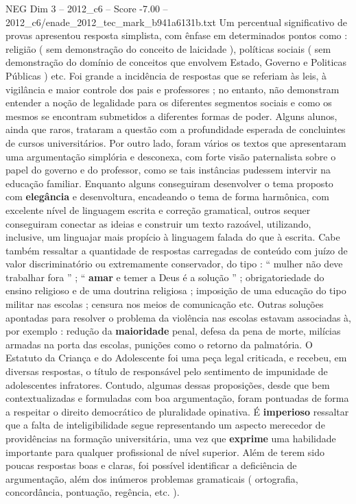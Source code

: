 \begin{textsample}{NEG Dim 3 – 2012\_c6 – Score -7.00 – 2012\_c6/enade\_2012\_tec\_mark\_b941a6131b.txt}
Um percentual significativo de provas apresentou resposta simplista, com ênfase em determinados pontos como : religião ( sem demonstração do conceito de laicidade ), políticas sociais ( sem demonstração do domínio de conceitos que envolvem Estado, Governo e Politicas Públicas ) etc.
Foi grande a incidência de respostas que se referiam às leis, à vigilância e maior controle dos pais e professores ; no entanto, não demonstram entender a noção de legalidade para os diferentes segmentos sociais e como os mesmos se encontram submetidos a diferentes formas de poder.
Alguns alunos, ainda que raros, trataram a questão com a profundidade esperada de concluintes de cursos universitários.
Por outro lado, foram vários os textos que apresentaram uma argumentação simplória e desconexa, com forte visão paternalista sobre o papel do governo e do professor, como se tais instâncias pudessem intervir na educação familiar.
Enquanto alguns conseguiram desenvolver o tema proposto com \textbf{elegância} e desenvoltura, encadeando o tema de forma harmônica, com excelente nível de linguagem escrita e correção gramatical, outros sequer conseguiram conectar as ideias e construir um texto razoável, utilizando, inclusive, um linguajar mais propício à linguagem falada do que à escrita.
Cabe também ressaltar a quantidade de respostas carregadas de conteúdo com juízo de valor discriminatório ou extremamente conservador, do tipo : “ mulher não deve trabalhar fora ” ; “ \textbf{amar} e temer a Deus é a solução ” ; obrigatoriedade do ensino religioso e de uma doutrina religiosa ; imposição de uma educação do tipo militar nas escolas ; censura nos meios de comunicação etc.
Outras soluções apontadas para resolver o problema da violência nas escolas estavam associadas à, por exemplo : redução da \textbf{maioridade} penal, defesa da pena de morte, milícias armadas na porta das escolas, punições como o retorno da palmatória.
O Estatuto da Criança e do Adolescente foi uma peça legal criticada, e recebeu, em diversas respostas, o título de responsável pelo sentimento de impunidade de adolescentes infratores.
Contudo, algumas dessas proposições, desde que bem contextualizadas e formuladas com boa argumentação, foram pontuadas de forma a respeitar o direito democrático de pluralidade opinativa.
É \textbf{imperioso} ressaltar que a falta de inteligibilidade segue representando um aspecto merecedor de providências na formação universitária, uma vez que \textbf{exprime} uma habilidade importante para qualquer profissional de nível superior.
Além de terem sido poucas respostas boas e claras, foi possível identificar a deficiência de argumentação, além dos inúmeros problemas gramaticais ( ortografia, concordância, pontuação, regência, etc. ).

\end{textsample}
